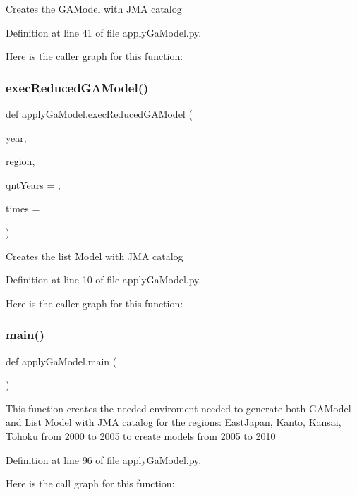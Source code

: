 \begin{DoxyVerb}Creates the GAModel with JMA catalog
\end{DoxyVerb}
 

Definition at line 41 of file apply\+Ga\+Model.\+py.

Here is the caller graph for this function\+:
\mbox{\label{namespaceapply_ga_model_a46ca0d0c0b7f182095423eabcdd32de9}} 
\subsubsection{\texorpdfstring{exec\+Reduced\+G\+A\+Model()}{execReducedGAModel()}}
{\footnotesize\ttfamily def apply\+Ga\+Model.\+exec\+Reduced\+G\+A\+Model (\begin{DoxyParamCaption}\item[{}]{year,  }\item[{}]{region,  }\item[{}]{qnt\+Years = {},  }\item[{}]{times = {} }\end{DoxyParamCaption})}

\begin{DoxyVerb}Creates the list Model with JMA catalog
\end{DoxyVerb}
 

Definition at line 10 of file apply\+Ga\+Model.\+py.

Here is the caller graph for this function\+:
\mbox{\label{namespaceapply_ga_model_a2844cb80b8188731fbc00cc0ea48f3cf}} 
\subsubsection{\texorpdfstring{main()}{main()}}
{\footnotesize\ttfamily def apply\+Ga\+Model.\+main (\begin{DoxyParamCaption}{ }\end{DoxyParamCaption})}

\begin{DoxyVerb}This function creates the needed enviroment needed to generate both GAModel and List Model with JMA catalog
for the regions: EastJapan, Kanto, Kansai, Tohoku
from 2000 to 2005 to create models from 2005 to 2010
\end{DoxyVerb}
 

Definition at line 96 of file apply\+Ga\+Model.\+py.

Here is the call graph for this function\+:
